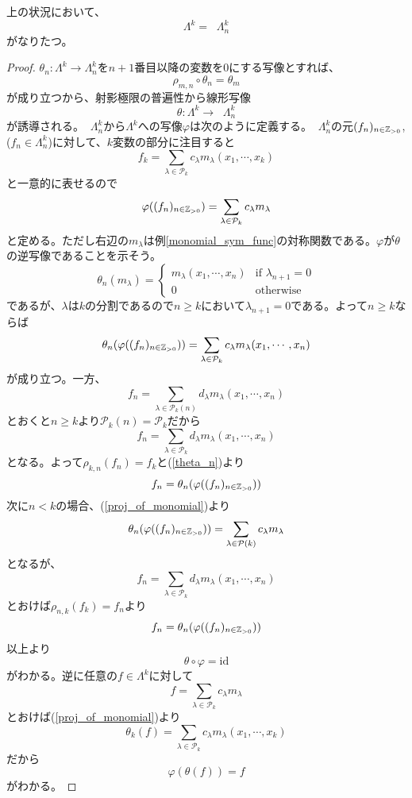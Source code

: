 \documentclass{ltjsreport}
\begin{document}
\begin{prop}\label{sym_func_is_inverselimit}
  上の状況において、
  \[
    \Lambda^k=\mathop{\lim_{\longleftarrow}}\Lambda^k_n
  \]
  がなりたつ。
\end{prop}

\begin{proof}
  $\theta_n:\Lambda^k\rightarrow\Lambda^k_n$を$n+1$番目以降の変数を$0$にする写像とすれば、
  \[
  \rho_{m,n}\circ\theta_n=\theta_m  
  \]
  が成り立つから、射影極限の普遍性から線形写像
  \[
  \theta:\Lambda^k\rightarrow\mathop{\lim_{\longleftarrow}}\Lambda^k_n
  \]
  が誘導される。$\mathop{\lim_{\longleftarrow}}\Lambda^k_n$から$\Lambda^k$への写像$\varphi$は次のように定義する。$\mathop{\lim_{\longleftarrow}}\Lambda^k_n$の元$(f_n)_{n\in\mathbb{Z}_{>0}}$, ($f_n\in\Lambda^k_n$)に対して、$k$変数の部分に注目すると
  \[
  f_k=\sum_{\lambda\in\mathcal{P}_k}c_\lambda m_\lambda(x_1,\cdots,x_k)
  \]
  と一意的に表せるので
  \[
  \varphi((f_n)_{n\in\mathbb{Z}_{>0}})
  =\sum_{\lambda\in\mathcal{P}_k}c_\lambda m_\lambda
  \]
  と定める。ただし右辺の$m_\lambda$は例\ref{monomial_sym_func}の対称関数である。$\varphi$が$\theta$の逆写像であることを示そう。
  \begin{equation}\label{proj_of_monomial}
  \theta_n(m_\lambda)=
  \left\{\begin{array}{cc}
    m_\lambda(x_1,\cdots,x_n) & \text{if }\lambda_{n+1}=0\\
    0 & \text{otherwise}
  \end{array}\right.  
\end{equation}
  であるが、$\lambda$は$k$の分割であるので$n\geq k$において$\lambda_{n+1}=0$である。よって$n\geq k$ならば
  \begin{equation}\label{theta_n}
  \theta_n(\varphi((f_n)_{n\in\mathbb{Z}_{>0}}))
  =\sum_{\lambda\in\mathcal{P}_k}c_\lambda m_\lambda(x_1,\cdots,x_n)  
  \end{equation}
  が成り立つ。一方、
  \[
  f_n=\sum_{\lambda\in\mathcal{P}_k(n)}d_\lambda m_\lambda(x_1,\cdots,x_n)    
  \]
  とおくと$n\geq k$より$\mathcal{P}_k(n)=\mathcal{P}_k$だから
  \[
  f_n=\sum_{\lambda\in\mathcal{P}_k}d_\lambda m_\lambda(x_1,\cdots,x_n)    
  \]
  となる。よって$\rho_{k,n}(f_n)=f_k$と(\ref{theta_n})より
  \[
  f_n=\theta_n(\varphi((f_n)_{n\in\mathbb{Z}_{>0}}))
  \]
  次に$n<k$の場合、(\ref{proj_of_monomial})より
  \[
  \theta_n(\varphi((f_n)_{n\in\mathbb{Z}_{>0}}))  
  =\sum_{\lambda\in\mathcal{P}(k)}c_\lambda m_\lambda
  \]
  となるが、
  \[
  f_n=\sum_{\lambda\in\mathcal{P}_k}d_\lambda m_\lambda(x_1,\cdots,x_n)    
  \]
  とおけば$\rho_{n,k}(f_k)=f_n$より
  \[
  f_n=\theta_n(\varphi((f_n)_{n\in\mathbb{Z}_{>0}}))
  \]
  以上より
  \[
  \theta\circ\varphi=\text{id}
  \]
  がわかる。逆に任意の$f\in\Lambda^k$に対して
  \[
  f=\sum_{\lambda\in\mathcal{P}_k}c_\lambda m_\lambda  
  \]
  とおけば(\ref{proj_of_monomial})より
  \[
  \theta_k(f)=\sum_{\lambda\in\mathcal{P}_k}c_\lambda m_\lambda(x_1,\cdots,x_k)
  \]
  だから
  \[
  \varphi(\theta(f))=f  
  \]
  がわかる。
\end{proof}
\end{document}
